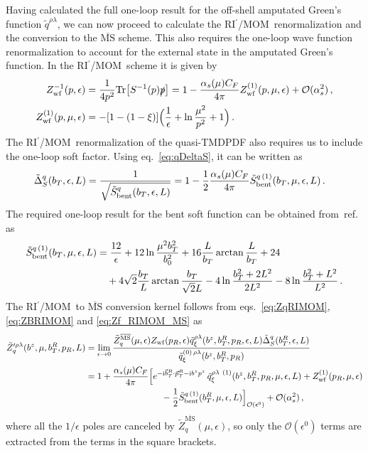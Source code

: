 \documentclass[11pt,a4paper]{article}
\DeclareRobustCommand{\eq}[1]{eq.~\eqref{eq:#1}}
\DeclareRobustCommand{\mycite}[1]{ref.~\cite{#1}}
\newcommand{\MS}{{\overline{\mathrm{MS}}}}
\newcommand{\img}{\mathrm{i}}
\newcommand{\eps}{\epsilon}
\newcommand{\cO}{\mathcal{O}}
\newcommand{\nn}{\nonumber}
\newcommand{\as}{\alpha_s}
\newcommand{\Tr}{\mathrm{Tr}}
\newcommand{\RIpMOM}{RI$^\prime$/MOM}
\begin{document}
Having calculated the full one-loop result for the off-shell amputated Green's function $\tilde q^{\rho\lambda}$,
we can now proceed to calculate the \RIpMOM~renormalization and the conversion to the $\MS$ scheme.
This also requires the one-loop wave function renormalization to account for the external state in the amputated Green's function.
In the \RIpMOM\ scheme it is given by~\cite{Martinelli:1994ty}
\begin{align} \label{eq:Zq}
 Z_{\rm wf}^{-1}(p,\eps) &
 = \frac{1}{4p^2} \Tr\bigl[ S^{-1}(p) \slashed{p}\bigr]
 = 1 - \frac{\as(\mu) C_F}{4\pi} Z_{\rm wf}^{(1)}(p,\mu,\eps) + \cO(\as^2)
  \,, \nn\\
 Z_{\rm wf}^{(1)}(p,\mu,\eps) &= -[1 - (1-\xi)] \Bigl(\frac{1}{\eps} + \ln\frac{\mu^2}{p^2} + 1 \Bigr)
\,.\end{align}
The \RIpMOM~renormalization of the quasi-TMDPDF also requires us to include the one-loop soft factor.
Using \eq{qDeltaS}, it can be written as
\begin{align} \label{eq:DeltaS_nlo}
 \tilde\Delta_S^q(b_T,\eps,L)  &
 = \frac{1}{\sqrt{\tilde S^q_{\rm bent}(b_T,\eps,L)}}
 = 1 - \frac12 \frac{\as(\mu) C_F}{4\pi} \tilde S^{q\,(1)}_{\rm bent}(b_T,\mu,\eps,L)
\,.\end{align}
The required one-loop result for the bent soft function can be obtained from~\mycite{Ebert:2019okf} as
\begin{align} \label{eq:qsoft_bent_nlo}
 \tilde S^{q\,(1)}_{\rm bent}(b_T,\mu,\eps,L) &
 = \frac{12}{\eps} + 12 \ln\frac{\mu^2 b_T^2}{b_0^2} + 16 \frac{L}{b_T} \arctan\frac{L}{b_T} + 24
   \nn\\&\quad
   + 4 \sqrt{2} \frac{b_T}{L} \arctan\frac{b_T}{\sqrt{2}L} - 4 \ln\frac{b_T^2+2L^2}{2 L^2} - 8 \ln\frac{b_T^2+L^2}{L^2}
\,.\end{align}
The \RIpMOM\ to $\MS$ conversion kernel follows from eqs.\ \eqref{eq:ZqRIMOM}, \eqref{eq:ZBRIMOM} and \eqref{eq:Zf_RIMOM_MS} as
\begin{align} \label{eq:Zq_nlo}
 \tilde Z_q^{\prime \rho\lambda}(b^z, \mu, b_T^R, p_R, L) &
 = \lim_{\eps\to0} \frac{\tilde Z_q^\MS(\mu,\eps)  Z_{\rm wf}(p_R,\eps) \tilde q^{\rho\lambda}_\xi(b^z,b_T^R,p_R,\eps,L) \tilde\Delta_S^q(b_T^R,\eps,L)}{\tilde q^{(0)\,\rho\lambda}_\xi(b^z, b_T^R, p_R)}
\nn\\&
= 1 + \frac{\as(\mu) C_F}{4\pi} \Bigl[ e^{-\img \vec b_T^R \cdot \vec p_T^R - \img b^z p^z} \, \tilde q^{\rho\lambda~(1)}_\xi(b^z, b_T^R,p_R,\mu,\eps,L) + Z_{\rm wf}^{(1)}(p_R,\mu,\eps)
   \nn\\&\hspace{3cm}
   - \frac12 \tilde S^{q\,(1)}_{\rm bent}(b_T^R,\mu,\eps,L) \Bigr]_{\cO(\eps^0)} + \cO(\as^2)
\,,\end{align}
where all the $1/\epsilon$ poles are canceled by $\tilde Z_q^\MS(\mu,\eps)$, so only the $\cO(\eps^0)$
terms are extracted from the terms in the square brackets.
\end{document}
